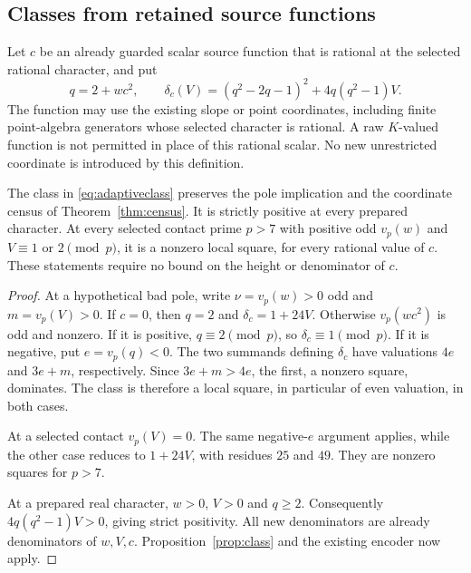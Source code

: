 \subsection{Classes from retained source functions}

Let $c$ be an already guarded scalar source function that is rational
at the selected rational character, and put
\begin{equation}\label{eq:adaptiveclass}
 q=2+wc^2,\qquad
 \delta_c(V)=(q^2-2q-1)^2+4q(q^2-1)V.
\end{equation}
The function may use the existing slope or point coordinates, including
finite point-algebra generators whose selected character is rational.
A raw $K$-valued function is not permitted in place of this rational
scalar. No new unrestricted coordinate is introduced by this definition.

\begin{proposition}\label{prop:adaptiveclass}
The class in \eqref{eq:adaptiveclass} preserves the pole implication
and the coordinate census of Theorem~\ref{thm:census}. It is strictly
positive at every prepared character. At every selected contact prime
$p>7$ with positive odd $v_p(w)$ and $V\equiv1$ or $2\pmod p$,
it is a nonzero local square, for every rational value of $c$.
These statements require no bound on the height or denominator of $c$.
\end{proposition}
\begin{proof}
At a hypothetical bad pole, write $\nu=v_p(w)>0$ odd and
$m=v_p(V)>0$. If $c=0$, then $q=2$ and $\delta_c=1+24V$.
Otherwise $v_p(wc^2)$ is odd and nonzero. If it is positive,
$q\equiv2\pmod p$, so $\delta_c\equiv1\pmod p$.
If it is negative, put $e=v_p(q)<0$. The two summands defining
$\delta_c$ have valuations $4e$ and $3e+m$, respectively.
Since $3e+m>4e$, the first, a nonzero square, dominates.
The class is therefore a local square, in particular of even
valuation, in both cases.

At a selected contact $v_p(V)=0$. The same negative-$e$ argument
applies, while the other case reduces to $1+24V$, with residues
$25$ and $49$. They are nonzero squares for $p>7$.

At a prepared real character, $w>0$, $V>0$ and $q\ge2$.
Consequently $4q(q^2-1)V>0$, giving strict positivity.
All new denominators are already denominators of $w,V,c$.
Proposition~\ref{prop:class} and the existing encoder now apply.
\end{proof}

